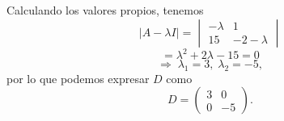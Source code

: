 \documentclass[
  11pt,
  letterpaper,
   addpoints,
   answers
  ]{exam}
\begin{document}
\begin{questions}
\begin{solution}
Calculando los valores propios, tenemos
\begin{equation}
\lvert A-\lambda I\rvert=
\begin{vmatrix}
-\lambda & 1\\
15 & -2-\lambda
\end{vmatrix}
\end{equation}
\begin{equation}
= \lambda^2+2\lambda-15=0
\end{equation}
\begin{equation}
\Rightarrow \;\lambda_1=3,\;\lambda_2=-5,
\end{equation}
por lo que podemos expresar $D$ como
\begin{equation}
D=\begin{pmatrix}
3 & 0\\
0 & -5
\end{pmatrix}.
\end{equation}


\end{solution}
\end{questions}
\end{document}
